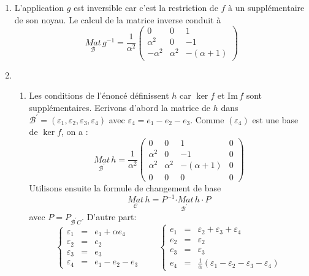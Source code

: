 \begin{enumerate}
\item  L'application $g$ est inversible car c'est la restriction de $f$ \`{a} un suppl\'{e}mentaire de son noyau. Le calcul de la matrice inverse
conduit \`{a} 
\[
\underset{\mathcal{B}}{Mat}\,g^{-1}=\frac{1}{\alpha ^{2}}\left( 
\begin{array}{ccc}
0 & 0 & 1 \\ 
\alpha ^{2} & 0 & -1 \\ 
-\alpha ^{2} & \alpha ^{2} & -(\alpha +1)
\end{array}
\right) 
\]

\item 
\begin{enumerate}
\item Les conditions de l'\'{e}nonc\'{e} d\'{e}finissent $h$ car $\ker f
$ et $\text{Im}\,f$ sont suppl\'{e}mentaires. Ecrivons d'abord la matrice de $h
$ dans $\mathcal{B}^{\prime }=(\varepsilon _{1},\varepsilon _{2},\varepsilon
_{3},\varepsilon _{4})$ avec $\varepsilon _{4}=e_{1}-e_{2}-e_{3}.$ Comme $%
(\varepsilon _{4})$ est une base de $\ker f$, on a : 
\[
\underset{\mathcal{B}^{\prime }}{Mat}\,h=\frac{1}{\alpha ^{2}}\left( 
\begin{array}{cccc}
0 & 0 & 1 & 0 \\ 
\alpha ^{2} & 0 & -1 & 0 \\ 
\alpha ^{2} & \alpha ^{2} & -(\alpha +1) & 0 \\ 
0 & 0 & 0 & 0
\end{array}
\right) 
\]
Utilisons ensuite la formule de changement de base $$\underset{\mathcal{C}}{Mat}\,h=P^{-1}\underset{\mathcal{B}^{\prime }}{\cdot Mat}\,h\cdot P$$
avec $P=P_{\mathcal{B}^{\prime }C}$. D'autre part: 
\[\left\{ \begin{array}{lll}
\varepsilon _{1} & = & e_{1}+\alpha e_{4} \\ 
\varepsilon _{2} & = & e_{2} \\ 
\varepsilon _{3} & = & e_{3} \\ 
\varepsilon _{4} & = & e_{1}-e_{2}-e_{3}
\end{array}
\right. \quad \quad \left\{ 
\begin{array}{lll}
e_{1} & = & \varepsilon _{2}+\varepsilon _{3}+\varepsilon _{4} \\ 
e_{2} & = & \varepsilon _{2} \\ 
e_{3} & = & \varepsilon _{3} \\ 
e_{4} & = & \frac{1}{\alpha }(\varepsilon _{1}-\varepsilon _{2}-\varepsilon
_{3}-\varepsilon _{4})
\end{array}
\]
\end{enumerate}
\end{enumerate}
